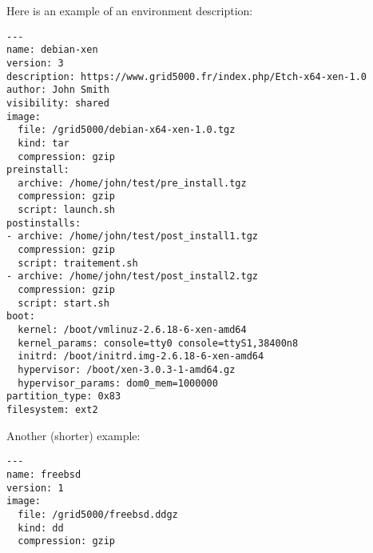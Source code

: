 \documentclass[a4wide,10pt,oneside]{book}
\begin{document}
Here is an example of an environment description:
\begin{small}
\begin{verbatim}
---
name: debian-xen
version: 3
description: https://www.grid5000.fr/index.php/Etch-x64-xen-1.0
author: John Smith
visibility: shared
image:
  file: /grid5000/debian-x64-xen-1.0.tgz
  kind: tar
  compression: gzip
preinstall:
  archive: /home/john/test/pre_install.tgz
  compression: gzip
  script: launch.sh
postinstalls:
- archive: /home/john/test/post_install1.tgz
  compression: gzip
  script: traitement.sh
- archive: /home/john/test/post_install2.tgz
  compression: gzip
  script: start.sh
boot:
  kernel: /boot/vmlinuz-2.6.18-6-xen-amd64
  kernel_params: console=tty0 console=ttyS1,38400n8
  initrd: /boot/initrd.img-2.6.18-6-xen-amd64
  hypervisor: /boot/xen-3.0.3-1-amd64.gz
  hypervisor_params: dom0_mem=1000000
partition_type: 0x83
filesystem: ext2
\end{verbatim}
\end{small}

Another (shorter) example:
\begin{small}
\begin{verbatim}
---
name: freebsd
version: 1
image:
  file: /grid5000/freebsd.ddgz
  kind: dd
  compression: gzip
\end{verbatim}
\end{small}
\end{document}
